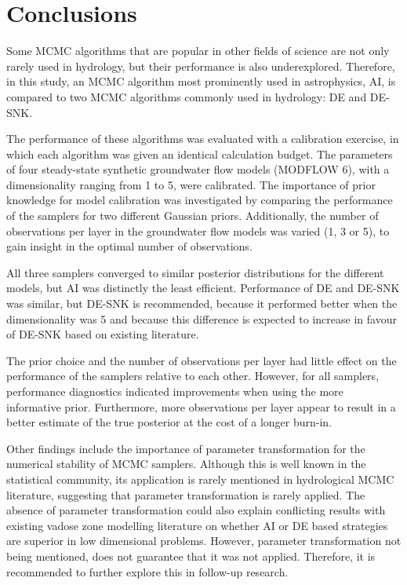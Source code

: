 \section{Conclusions}\label{Conclusions}
%
Some MCMC algorithms that are popular in other fields of science are not only rarely used in hydrology, but their performance is also underexplored. Therefore, in this study, an MCMC algorithm most prominently used in astrophysics, AI, is compared to two MCMC algorithms commonly used in hydrology: DE and DE-SNK. 

The performance of these algorithms was evaluated with a calibration exercise, in which each algorithm was given an identical calculation budget. The parameters of four steady-state synthetic groundwater flow models (MODFLOW 6), with a dimensionality ranging from 1 to 5, were calibrated. The importance of prior knowledge for model calibration was investigated by comparing the performance of the samplers for two different Gaussian priors. Additionally, the number of observations per layer in the groundwater flow models was varied (1, 3 or 5), to gain insight in the optimal number of observations.

All three samplers converged to similar posterior distributions for the different models, but AI was distinctly the least efficient. Performance of DE and DE-SNK was similar, but DE-SNK is recommended, because it performed better when the dimensionality was 5 and because this difference is expected to increase in favour of DE-SNK based on existing literature. 

The prior choice and the number of observations per layer had little effect on the performance of the samplers relative to each other. However, for all samplers, performance diagnostics indicated improvements when using the more informative prior. Furthermore, more observations per layer appear to result in a better estimate of the true posterior at the cost of a longer burn-in. 

Other findings include the importance of parameter transformation for the numerical stability of MCMC samplers. Although this is well known in the statistical community, its application is rarely mentioned in hydrological MCMC literature, suggesting that parameter transformation is rarely applied. The absence of parameter transformation could also explain conflicting results with existing vadose zone modelling literature on whether AI or DE based strategies are superior in low dimensional problems. However, parameter transformation not being mentioned, does not guarantee that it was not applied. Therefore, it is recommended to further explore this in follow-up research.  

